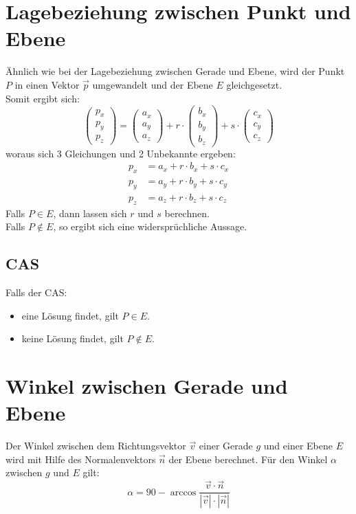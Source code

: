 \documentclass[a4paper,12pt]{article}
\begin{document}
\section{Lagebeziehung zwischen Punkt und Ebene}
Ähnlich wie bei der Lagebeziehung zwischen Gerade und Ebene, wird der Punkt $P$ in einen Vektor $\vec{p}$ umgewandelt und der Ebene $E$ gleichgesetzt.\\
Somit ergibt sich:
$$\begin{pmatrix}p_x\\p_y\\p_z\end{pmatrix} = \begin{pmatrix}a_x\\a_y\\a_z\end{pmatrix} + r \cdot \begin{pmatrix}b_x\\b_y\\b_z\end{pmatrix} + s \cdot \begin{pmatrix}c_x\\c_y\\c_z\end{pmatrix}$$
woraus sich 3 Gleichungen und 2 Unbekannte ergeben:
\begin{equation}
\begin{split}
p_x & = a_x + r \cdot b_x + s \cdot c_x\\ 
p_y & = a_y + r \cdot b_y + s \cdot c_y\\ 
p_z & = a_z + r \cdot b_z + s \cdot c_z
\end{split}
\end{equation}
Falls $P \in E$, dann lassen sich $r$ und $s$ berechnen.\\
Falls $P \notin E$, so ergibt sich eine widersprüchliche Aussage.
\subsection{CAS}
Falls der CAS:
\begin{itemize}
\item eine Lösung findet, gilt $P \in E$.
\item keine Lösung findet, gilt $P \notin E$.
\end{itemize}
\section{Winkel zwischen Gerade und Ebene}
Der Winkel zwischen dem Richtungsvektor $\vec{v}$ einer Gerade $g$ und einer Ebene $E$ wird mit Hilfe des Normalenvektors $\vec{n}$ der Ebene berechnet.
Für den Winkel $\alpha$ zwischen $g$ und $E$ gilt:
$$\alpha = 90 - \arccos{\frac{\vec{v} \cdot \vec{n}}{|\vec{v}| \cdot |\vec{n}|}}$$
\pagebreak
\end{document}
